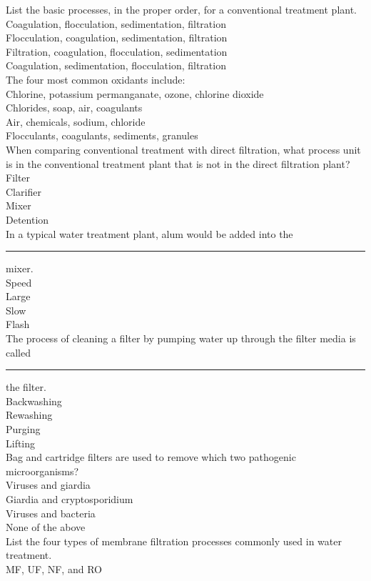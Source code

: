 List the basic processes, in the proper order, for a conventional treatment plant.\\
Coagulation, flocculation, sedimentation, filtration\\
Flocculation, coagulation, sedimentation, filtration\\
Filtration, coagulation, flocculation, sedimentation\\
Coagulation, sedimentation, flocculation, filtration\\
The four most common oxidants include:\\
Chlorine, potassium permanganate, ozone, chlorine dioxide\\
Chlorides, soap, air, coagulants\\
Air, chemicals, sodium, chloride\\
Flocculants, coagulants, sediments, granules\\
When comparing conventional treatment with direct filtration, what process unit is in the conventional treatment plant that is not in the direct filtration plant?\\
Filter\\
Clarifier\\
Mixer\\
Detention\\
In a typical water treatment plant, alum would be added into the \rule{1cm}{0.5pt}  mixer.\\
Speed\\
Large\\
Slow\\
Flash\\
The process of cleaning a filter by pumping water up through the filter media is called \rule{1cm}{0.5pt}  the filter.\\
Backwashing\\
Rewashing\\
Purging\\
Lifting\\
Bag and cartridge filters are used to remove which two pathogenic microorganisms?\\
Viruses and giardia\\
Giardia and cryptosporidium\\
Viruses and bacteria\\
None of the above\\
List the four types of membrane filtration processes commonly used in water\\
treatment.\\
MF, UF, NF, and RO\\
